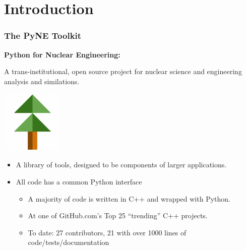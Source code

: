 \documentclass[12pt]{beamer}
\begin{document}
\section{Introduction}
\begin{frame}[fragile]
\frametitle{The PyNE Toolkit}

\centerline{\bf Python for Nuclear Engineering:}
A trans-institutional, open source project for nuclear science and engineering analysis and similations.

\centerline{\includegraphics[width=3cm]{figures/pyne_icon_small.png}}

\begin{itemize}
\item{A library of tools, designed to be components of larger applications.}
\item{All code has a common Python interface}
\begin{itemize}
\item{A majority of code is written in C++ and wrapped with Python.}
\item{At one of GitHub.com's Top 25 ``trending'' C++ projects.}
\item{To date: 27 contributors, 21 with over 1000 lines of code/tests/documentation}
\end{itemize}
\end{itemize}


\end{frame}
\end{document}

